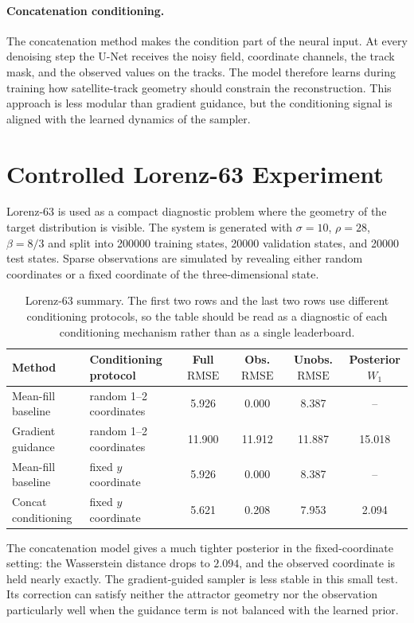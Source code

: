 \documentclass[10pt,a4paper]{article}
\newcommand{\rmse}{\operatorname{RMSE}}
\begin{document}
\paragraph{Concatenation conditioning.}
The concatenation method makes the condition part of the neural input. At every denoising step the U-Net receives the noisy field, coordinate channels, the track mask, and the observed values on the tracks. The model therefore learns during training how satellite-track geometry should constrain the reconstruction. This approach is less modular than gradient guidance, but the conditioning signal is aligned with the learned dynamics of the sampler.

\section{Controlled Lorenz-63 Experiment}

Lorenz-63 is used as a compact diagnostic problem where the geometry of the target distribution is visible. The system is generated with $\sigma=10$, $\rho=28$, $\beta=8/3$ and split into 200000 training states, 20000 validation states, and 20000 test states. Sparse observations are simulated by revealing either random coordinates or a fixed coordinate of the three-dimensional state.

\begin{table}[H]
\centering
\footnotesize
\begin{tabular}{llcccc}
\toprule
Method & Conditioning protocol & Full $\rmse$ & Obs. $\rmse$ & Unobs. $\rmse$ & Posterior $W_1$ \\
\midrule
Mean-fill baseline & random 1--2 coordinates & 5.926 & 0.000 & 8.387 & -- \\
Gradient guidance & random 1--2 coordinates & 11.900 & 11.912 & 11.887 & 15.018 \\
Mean-fill baseline & fixed $y$ coordinate & 5.926 & 0.000 & 8.387 & -- \\
Concat conditioning & fixed $y$ coordinate & 5.621 & 0.208 & 7.953 & 2.094 \\
\bottomrule
\end{tabular}
\caption{Lorenz-63 summary. The first two rows and the last two rows use different conditioning protocols, so the table should be read as a diagnostic of each conditioning mechanism rather than as a single leaderboard.}
\label{tab:lorenz}
\end{table}

The concatenation model gives a much tighter posterior in the fixed-coordinate setting: the Wasserstein distance drops to $2.094$, and the observed coordinate is held nearly exactly. The gradient-guided sampler is less stable in this small test. Its correction can satisfy neither the attractor geometry nor the observation particularly well when the guidance term is not balanced with the learned prior.
\end{document}
